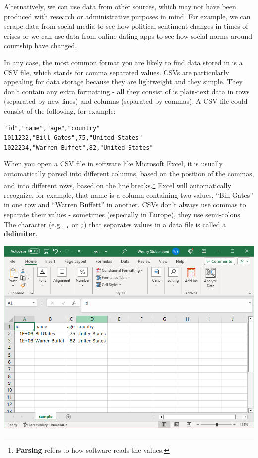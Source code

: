 \documentclass[
  letterpaper,
]{book}
\begin{document}
Alternatively, we can use data from other sources, which may not have
been produced with research or administrative purposes in mind. For
example, we can scrape data from social media to see how political
sentiment changes in times of crises or we can use data from online
dating apps to see how social norms around courtship have changed.

In any case, the most common format you are likely to find data stored
in is a CSV file, which stands for comma separated values. CSVs are
particularly appealing for data storage because they are lightweight and
they simple. They don't contain any extra formatting - all they consist
of is plain-text data in rows (separated by new lines) and columns
(separated by commas). A CSV file could consist of the following, for
example:

\begin{verbatim}
"id","name","age","country"
1011232,"Bill Gates",75,"United States"
1022234,"Warren Buffet",82,"United States"
\end{verbatim}

When you open a CSV file in software like Microsoft Excel, it is usually
automatically parsed into different columns, based on the position of
the commas, and into different rows, based on the line
breaks.\footnote{\textbf{Parsing} refers to how software reads the
  values.} Excel will automatically recognize, for example, that name is
a column containing two values, ``Bill Gates'' in one row and ``Warren
Buffett'' in another. CSVs don't always use commas to separate their
values - sometimes (especially in Europe), they use semi-colons. The
character (e.g., \texttt{,} or \texttt{;}) that separates values in a
data file is called a \textbf{delimiter}.

\includegraphics[width=6.32292in,height=\textheight]{images/excel-parsing.PNG}
\end{document}
